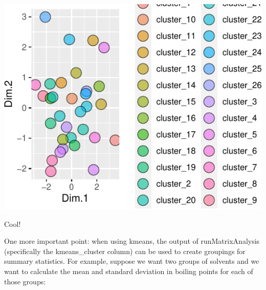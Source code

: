 \documentclass[
]{krantz}
\begin{document}
\begin{center}\includegraphics{index_files/figure-latex/unnamed-chunk-107-1} \end{center}

Cool!

One more important point: when using kmeans, the output of runMatrixAnalysis (specifically the kmeans\_cluster column) can be used to create groupings for summary statistics. For example, suppose we want two groups of solvents and we want to calculate the mean and standard deviation in boiling points for each of those groups:
\end{document}
